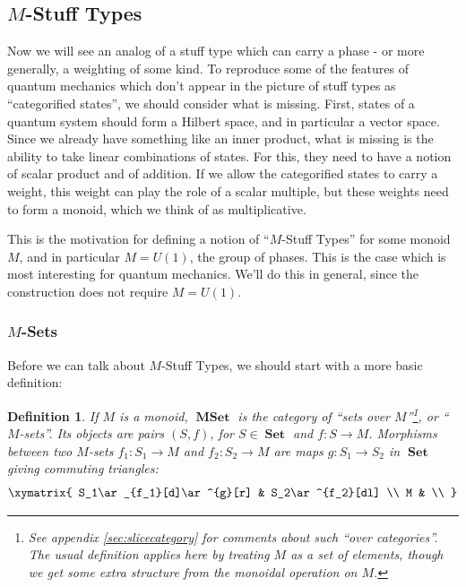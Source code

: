 \documentclass{amsart} \usepackage{amsmath,amssymb,bbm}
\newcommand{\opname}[1]{\operatorname{#1}}
\newtheorem{definition}{Definition}
\newcommand{\catname}[1]{\boldsymbol{\opname{{#1}}}}
\newcommand{\Set}{\catname{Set}}
\begin{document}
\subsection{$M$-Stuff Types}

Now we will see an analog of a stuff type which can carry a phase - or
more generally, a weighting of some kind.  To reproduce some of the
features of quantum mechanics which don't appear in the picture of
stuff types as ``categorified states'', we should consider what is
missing.  First, states of a quantum system should form a Hilbert
space, and in particular a vector space.  Since we already have
something like an inner product, what is missing is the ability to
take linear combinations of states.  For this, they need to have a
notion of scalar product and of addition.  If we allow the
categorified states to carry a weight, this weight can play the role
of a scalar multiple, but these weights need to form a monoid, which
we think of as multiplicative.

This is the motivation for defining a notion of ``$M$-Stuff Types''
for some monoid $M$, and in particular $M = U(1)$, the group of
phases.  This is the case which is most interesting for quantum
mechanics.  We'll do this in general, since the construction does
not require $M = U(1)$.

\subsubsection{$M$-Sets}

Before we can talk about $M$-Stuff Types, we should start with a more basic
definition:

\begin{definition}
  If $M$ is a monoid, $\catname{MSet}$ is the category of ``sets over
  $M$''{\footnote{See appendix \ref{sec:slicecategory} for comments
  about such ``over categories''.  The usual definition applies here by
  treating $M$ as a set of elements, though we get some extra
  structure from the monoidal operation on $M$.}}, or ``$M$-sets''.
  Its objects are pairs $(S,f)$, for $S \in \Set$ and $f : S
  \rightarrow M$.  Morphisms between two $M$-sets $f_1 : S_1
  \rightarrow M$ and $f_2 : S_2 \rightarrow M$ are maps $g : S_1
  \rightarrow S_2$ in $\catname{Set}$ giving commuting triangles:
  \begin{equation}
   \xymatrix{
    S_1\ar_{f_1}[d]\ar^{g}[r] & S_2\ar^{f_2}[dl] \\
    M & \\
   }
  \end{equation}
\end{definition}
\end{document}
